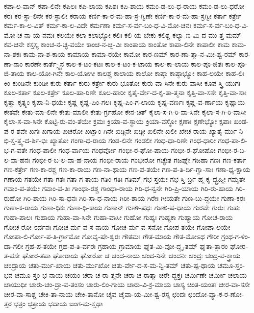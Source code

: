 {ಕಪಾ-ಲ-ವಾನ್
ಕಪಾ-ಲಿನೇ
ಕಪಿಲಃ
ಕಪಿ-ಲಾಯ
ಕಪಿಶಃ
ಕಪಿ-ಶಾಯ
ಕಮಂ-ಡ-ಲು-ಧ-ರಾಯ
ಕಮಂ-ಡ-ಲು-ಧರೋ
ಕರಃ
ಕರ-ಸ್ಥಾ-ಲಿನೇ
ಕರ-ಸ್ಥಾಲೀ
ಕರಾಯ
ಕರ್ಣಿ-ಕಾ-ರ-ಮ-ಹಾ-ಸ್ರ-ಗ್ವಿಣೇ
ಕರ್ಣಿ-ಕಾ-ರ-ಮ-ಹಾ-ಸ್ರಗ್ವೀ
ಕರ್ತಾ
ಕರ್ತ್ರೇ
ಕರ್ಮ-ಕಾ-ಲ-ವಿತ್
ಕರ್ಮ-ಕಾ-ಲ-ವಿದೇ
ಕರ್ಮಣಾ
ಕರ್ಮ-ಸ-ರ್ವ-ಬಂ-ಧ-ವಿ-ಮೋ-ಚನಃ
ಕರ್ಮ-ಸ-ರ್ವ-ಬಂ-ಧ-ವಿ-ಮೋ-ಚ-ನಾ-ಯ-ನಮಃ
ಕಲಯೇ
ಕಲಾ
ಕಲಾಭ್ಯೋ
ಕಲಿಃ
ಕಲಿ-ಯ-ಬೇಕು
ಕಲಿಶ್ಚ
ಕಲ್ಯಾ-ಣ-ಮಿ-ದ-ಮು-ತ್ತ-ಮಮ್
ಕವ-ಚಿನೇ
ಕಸ್ತಸ್ಯ
ಕಾಂಚ-ನ-ಚ್ಛ-ವಯೇ
ಕಾಂಚ-ನ-ಚ್ಛ-ವಿಃ
ಕಾಂತಾಯ
ಕಾಂತೋ
ಕಾಪಾ-ಲಿನೇ
ಕಾಪಾಲೀ
ಕಾಮ
ಕಾಮ-ನಾ-ಶಕಃ
ಕಾಮ-ನಾ-ಶ-ಕಾಯ
ಕಾಮಾಯ
ಕಾಮಾ-ರಯೇ
ಕಾಮೋ
ಕಾರ-ಣಮ್
ಕಾರ-ಣಾ-ತ್ಮಾ-ನ-ಮೀ-ಶ್ವ-ರಮ್
ಕಾರ-ಣಾ-ನಾಂ
ಕಾರಣೇ
ಕಾರ್ತೆ-್ಸ್ನ್ಯನ
ಕಾಲ-ಕ-ಟಂ-ಕಟಃ
ಕಾಲ-ಕ-ಟಂ-ಕ-ಟಾಯ
ಕಾಲ-ಕಾ-ಲಾಯ
ಕಾಲ-ಪೂ-ಜಿತಃ
ಕಾಲ-ಪೂ-ಜಿ-ತಾಯ
ಕಾಲ-ಯೋ-ಗಿನೇ
ಕಾಲ-ಯೋಗೀ
ಕಾಲಶ್ಚ
ಕಾಲಾಯ
ಕಾಲೋ
ಕಾಷ್ಠಾ
ಕಾಷ್ಠಾಭ್ಯೋ
ಕಾಹ-ಲಯೇ
ಕಾಹ-ಲಿಃ
ಕಿಂ
ಕುಂಡಿನೇ
ಕುಂಡೀ
ಕುರು-ಕರ್ತಾ
ಕುರು-ಕರ್ತ್ರೇ
ಕುರು-ಭೂತೋ
ಕುರು-ವಾ-ಸಿನೇ
ಕುರು-ವಾಸೀ
ಕೂಪ-ಸ್ತ್ರಿ-ಯುಗಃ
ಕೂಲ-ಕರ್ತಾ
ಕೂಲ-ಕರ್ತ್ರೇ
ಕೂಲ-ಹಾ-ರಿಣೇ
ಕೂಲ-ಹಾರೀ
ಕೃತೈ-ರ್ವೇ-ದ-ಕೃ-ತಾ-ತ್ಮನಾ
ಕೃತ್ತಿ-ವಾ-ಸಸೇ
ಕೃತ್ತಿ-ವಾ-ಸಾಃ
ಕೃತ್ವಾ
ಕೃತ್ಸ್ನಂ
ಕೃಪಾ-ನಿ-ಧಯೇ
ಕೃಷ್ಣ
ಕೃಷ್ಣ-ಪಿಂ-ಗಲಃ
ಕೃಷ್ಣ-ಪಿಂ-ಗ-ಲಾಯ
ಕೃಷ್ಣ-ವರ್ಣಃ
ಕೃಷ್ಣ-ವ-ರ್ಣಾಯ
ಕೃಷ್ಣಾಯ
ಕೇತವೇ
ಕೇತು-ಮಾ-ಲಿನೇ
ಕೇತು-ಮಾಲೀ
ಕೇತು-ರ್ಗ್ರಹೋ
ಕೇನ-ಚಿತ್
ಕೈಲಾ-ಸ-ಗಿ-ರಿ-ವಾ-ಸಿನೇ
ಕೈಲಾ-ಸ-ಗಿ-ರಿ-ವಾಸೀ
ಕೈಲಾ-ಸ-ವಾ-ಸಿನೇ
ಕೊಟ್ಟಿ-ರು-ವಂ-ತೆಯೇ
ಕ್ರಮಃ
ಕ್ರಿಯಾ-ವ-ಸ್ಥಾಯ
ಕ್ರಿಯಾ-ವಸ್ಥೋ
ಕ್ಷಣಾಃ
ಕ್ಷಣೇಭ್ಯೋ
ಕ್ಷಪಾಃ
ಖಂಡ-ಪ-ರ-ಶವೇ
ಖಗಃ
ಖಗಾಯ
ಖಚರೋ
ಖಟ್ವಾಂ-ಗಿನೇ
ಖಡ್ಗಿನೇ
ಖಡ್ಗೀ
ಖಲಿನೇ
ಖಲೀ
ಖೇಚ-ರಾಯ
ಖ್ಯಾತೈ-ರ್ಮು-ನಿ-ಭಿ-ಸ್ತ-ತ್ತ್ವ-ದ-ರ್ಶಿ-ಭಿಃ
ಖ್ಯಾತೋ
ಗಂಗಾ-ಧ-ರಾಯ
ಗಂಡ-ಲಿನೇ
ಗಂಡಲೀ
ಗಂಧ-ಧಾ-ರಿಣೇ
ಗಂಧ-ಧಾರೀ
ಗಂಧ-ಪಾ-ಲಿ-ಭ-ಗ-ವತೇ
ಗಂಧ-ಪಾಲೀ
ಗಂಧ-ರ್ವಾಯ
ಗಂಧರ್ವೋ
ಗಂಭೀ-ರ-ಘೋ-ಷಾಯ
ಗಂಭೀ-ರ-ಘೋಷೋ
ಗಂಭೀ-ರ-ಬ-ಲ-ವಾ-ಹನಃ
ಗಂಭೀ-ರ-ಬ-ಲ-ವಾ-ಹ-ನಾಯ
ಗಂಭೀ-ರಾಯ
ಗಂಭೀರೋ
ಗಚ್ಛೇತ
ಗಜಘ್ನೇ
ಗಜಹಾ
ಗಣಃ
ಗಣ-ಕರ್ತಾ
ಗಣ-ಕರ್ತ್ರೇ
ಗಣ-ಕಾ-ರಶ್ಚ
ಗಣ-ಕಾ-ರಾಯ
ಗಣ-ನಾ-ಥಾಯ
ಗಣ-ಪ-ತಯೇ
ಗಣ-ಪ-ತಿ-ರ್ದಿ-ಗ್ವಾ-ಸಾಃ
ಗಣಾ-ಧ್ಯ-ಕ್ಷಾಯ
ಗಣಾಯ
ಗತಯೇ
ಗತಾ-ಗತಃ
ಗತಾ-ಗ-ತಾಯ
ಗತಿಂ
ಗತಿಃ
ಗತಿಮ್
ಗಭ-ಸ್ತಯೇ
ಗಭ-ಸ್ತಿ-ರ್ಬ್ರ-ಹ್ಮ-ಕೃ-ದ್ಬ್ರಹ್ಮೀ
ಗಮ್ಯತೇ
ಗವಾಂ-ಪ-ತಯೇ
ಗವಾಂ-ಪ-ತಿಃ
ಗಾಂಧಾ-ರಶ್ಚ
ಗಾಂಧಾ-ರಾಯ
ಗಿರಿ-ಧ-ನ್ವನೇ
ಗಿರಿ-ಪ್ರಿ-ಯಾಯ
ಗಿರಿ-ರು-ಹಾಯ
ಗಿರಿ-ರುಹೋ
ಗಿರಿ-ಶಾಯ
ಗಿರಿ-ಸಾ-ಧನಃ
ಗಿರಿ-ಸಾ-ಧ-ನಾಯ
ಗಿರೀ-ಶಾಯ
ಗಿರೇಃ
ಗೀಯತೇ
ಗುಣ-ಬು-ದ್ಧಯೇ
ಗುಣಾ-ಕರಃ
ಗುಣಾ-ಕ-ರಾಯ
ಗುಣಾ-ಧಿಕಃ
ಗುಣಾ-ಧಿ-ಕಾಯ
ಗುಣಾನ್
ಗುಣೌ-ಷಧಃ
ಗುಣೌ-ಷ-ಧಾಯ
ಗುರವೇ
ಗುರುಃ
ಗುಹಃ
ಗುಹಾ-ಪಾಲಃ
ಗುಹಾಯ
ಗುಹಾ-ವಾ-ಸಿನೇ
ಗುಹಾ-ವಾಸೀ
ಗುಹೋ
ಗುಹ್ಯಃ
ಗುಹ್ಯಕಾ
ಗುಹ್ಯಾಯ
ಗೋಚ-ರಾಯ
ಗೋಚ-ರೋ-ಽರ್ದನಃ
ಗೋಚ-ರ್ಮ-ವ-ಸ-ನಾಯ
ಗೋಚ-ರ್ಮ-ವ-ಸನೋ
ಗೋಪ-ತಯೇ
ಗೋಪಾ-ಲಯೇ
ಗೋಪಾ-ಲಿ-ರ್ಗೋ-ಪ-ತಿ-ರ್ಗ್ರಾಮೋ
ಗೋವೃ-ಷೇ-ಶ್ವರಃ
ಗೌತಮಃ
ಗೌತ-ಮಾಯ
ಗೌತ-ಮೋಽಥ
ಗೌರೀ
ಗ್ರಂಥ-ಗ-ಳಿಂ-ದಾ-ಗಲೀ
ಗ್ರಹ-ಪ-ತಯೇ
ಗ್ರಹ-ಪ-ತಿ-ರ್ವರಃ
ಗ್ರಹಾಯ
ಗ್ರಾಮಾಯ
ಘೃತ-ಮಿ-ವೋ-ದ್ಧೃ-ತಮ್
ಘೃತಾ-ತ್ಸಾರಂ
ಘೋರ-ತ-ಪಸೇ
ಘೋರ-ತಪಾ
ಘೋರಾಯ
ಘೋರೋ
ಚ
ಚಂದ-ನಾಯ
ಚಂದ-ನಿನೇ
ಚಂದನೀ
ಚಂದ್ರಃ
ಚಂದ್ರ-ವ-ಕ್ತ್ರಾಯ
ಚಂದ್ರಾಯ
ಚತು-ರ್ಮು-ಖಾಯ
ಚತು-ರ್ಮುಖೋ
ಚತು-ರ್ವೇ-ದ-ಸ-ಮ-ನ್ವಿ-ತಮ್
ಚತು-ಷ್ಪ-ಥಾಯ
ಚಮೂ-ಸ್ತಂ-ಭನ
ಚಮೂ-ಸ್ತಂ-ಭ-ನಾಯ
ಚಯಂ
ಚರಾ-ಚ-ರಾ-ತ್ಮನೇ
ಚರಾ-ಚ-ರಾತ್ಮಾ
ಚರೇ-ದ್ಭಕ್ತಃ
ಚರ್ಮಿಣೇ
ಚರ್ಮೀ
ಚಲಾಯ
ಚಾಯುಧೀ
ಚಾರು-ಚಂ-ದ್ರಾ-ವ-ತಂಸಂ
ಚಾರು-ಲಿಂ-ಗಾಯ
ಚಾರು-ವಿ-ಕ್ರ-ಮಾಯ
ಚಾಸ್ಯ
ಚಿಂತ-ಯಂತಃ
ಚೀರ-ವಾ-ಸಸೇ
ಚೀರ-ವಾ-ಸಾಶ್ಚ
ಚೇಕಿ-ತಾ-ನಾಯ
ಚೇಕಿ-ತಾನೋ
ಚೈವ
ಚೈವಾ-ಯ-ಮೀ-ಶ್ವ-ರಸ್ಯ
ಛಂದಃ
ಛಂದೋ-ವ್ಯಾ-ಕ-ರ-ಣೋ-ತ್ತರ
ಛತ್ರಂ
ಛತ್ರಾಯ
ಛದಾಯ
ಜಂಗ-ಮ-ಸ್ತಥಾ
}
